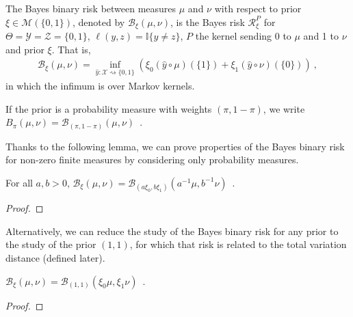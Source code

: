 \begin{definition}
  \label{def:bayesBinaryRisk}
  \leanok
  The Bayes binary risk between measures $\mu$ and $\nu$ with respect to prior $\xi \in \mathcal M(\{0,1\})$, denoted by $\mathcal B_\xi(\mu, \nu)$, is the Bayes risk $\mathcal R^P_\xi$ for $\Theta = \mathcal Y = \mathcal Z = \{0,1\}$, $\ell(y,z) = \mathbb{I}\{y \ne z\}$, $P$ the kernel sending 0 to $\mu$ and 1 to $\nu$ and prior $\xi$.
  That is,
  \begin{align*}
  \mathcal B_\xi(\mu, \nu) = \inf_{\hat{y} : \mathcal X \rightsquigarrow \{0,1\}}\left(\xi_0 (\hat{y} \circ \mu)(\{1\}) + \xi_1 (\hat{y} \circ \nu)(\{0\})\right)
  \: ,
  \end{align*}
  in which the infimum is over Markov kernels.

  If the prior is a probability measure with weights $(\pi, 1 - \pi)$, we write $B_\pi(\mu, \nu) = \mathcal B_{(\pi, 1 - \pi)}(\mu, \nu)$~.
\end{definition}

Thanks to the following lemma, we can prove properties of the Bayes binary risk for non-zero finite measures by considering only probability measures.

\begin{lemma}
  \label{lem:bayesBinaryRisk_mul}
  \leanok
  For all $a, b > 0$, $\mathcal B_\xi(\mu, \nu) = \mathcal B_{(a \xi_0, b \xi_1)}(a^{-1} \mu, b^{-1} \nu)$~.
\end{lemma}

\begin{proof}\leanok
\uses{}

\end{proof}

Alternatively, we can reduce the study of the Bayes binary risk for any prior to the study of the prior $(1, 1)$, for which that risk is related to the total variation distance (defined later).

\begin{lemma}
  \label{lem:bayesBinaryRisk_one_one}
  \leanok
  $\mathcal B_\xi(\mu, \nu) = \mathcal B_{(1,1)}(\xi_0\mu, \xi_1\nu)$~.
\end{lemma}

\begin{proof}\leanok
{}

\end{proof}

